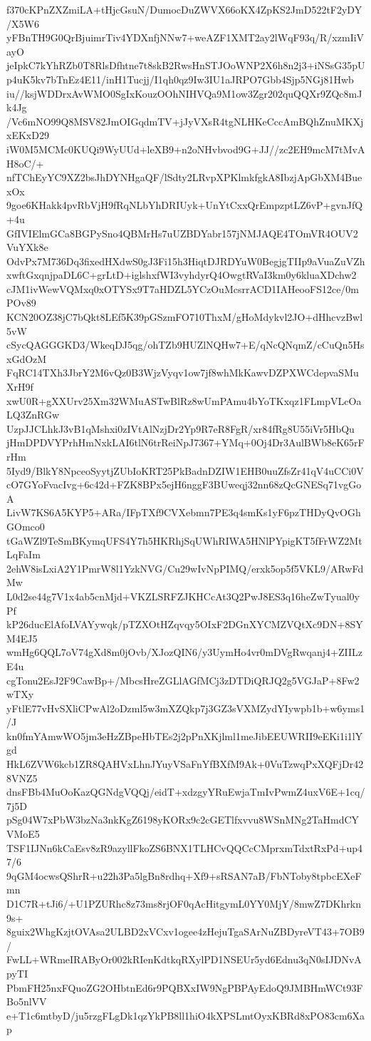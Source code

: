 f370cKPnZXZmiLA+tHjcGsuN/DumocDuZWVX66oKX4ZpKS2JmD522tF2yDY/X5W6
yFBnTH9G0QrBjuimrTiv4YDXnfjNNw7+weAZF1XMT2ay2lWqF93q/R/xzmIiVayO
jeIpkC7kYhRZb0T8RlsDfhtne7t8skB2RwsHnSTJOoWNP2X6h8n2j3+iNSsG35pU
p4uK5kv7bTnEz4E11/inH1Tucjj/I1qh0qz9Iw3IU1aJRPO7Gbb4Sjp5NGj81Hwb
iu//ksjWDDrxAvWMO0SgIxKouzOOhNIHVQa9M1ow3Zgr202quQQXr9ZQc8mJk4Jg
/Vc6mNO99Q8MSV82JmOIGqdmTV+jJyVXsR4tgNLHKeCccAmBQhZnuMKXjxEKxD29
iW0M5MCMc0KUQi9WyUUd+leXB9+n2oNHvbvod9G+JJ//zc2EH9mcM7tMvAH8oC/+
nfTChEyYC9XZ2bsJhDYNHgaQF/lSdty2LRvpXPKlmkfgkA8IbzjApGbXM4BuexOx
9goe6KHakk4pvRbVjH9fRqNLbYhDRIUyk+UnYtCxxQrEmpzptLZ6vP+gvnJfQ+4u
GfIVIElmGCa8BGPySno4QBMrHs7uUZBDYabr157jNMJAQE4TOmVR4OUV2VuYXk8e
OdvPx7M736Dq3fixedHXdwS0gJ3Fi15h3HiqtDJRDYuW0BegjgTIIp9aVuaZuVZh
xwftGxqnjpaDL6C+grLtD+iglshxfWI3vyhdyrQ4OwgtRVaI3km0y6kluaXDchw2
cJM1ivWewVQMxq0xOTYSx9T7aHDZL5YCzOuMcsrrACD1IAHeooFS12ce/0mPOv89
KCN20OZ38jC7bQkt8LEf5K39pGSzmFO710ThxM/gHoMdykvl2JO+dHhcvzBwl5vW
cSycQAGGGKD3/WkeqDJ5qg/ohTZb9HUZlNQHw7+E/qNcQNqmZ/cCuQn5HsxGdOzM
FqRC14TXh3JbrY2M6vQz0B3WjzVyqv1ow7jf8whMkKawvDZPXWCdepvaSMuXrH9f
xwU0R+gXXUrv25Xm32WMuASTwBlRz8wUmPAmu4bYoTKxqz1FLmpVLcOaLQ3ZnRGw
UzpJJCLhkJ3vB1qMshxi0zIVtAlNzjDr2Yp9R7eR8FgR/xr84fRg8U55iVr5HbQu
jHmDPDVYPrhHmNxkLAI6tlN6trReiNpJ7367+YMq+0Oj4Dr3AulBWb8eK65rFrHm
5Iyd9/BlkY8NpceoSyytjZUbIoKRT25PkBadnDZIW1EHB0uuZfsZr41qV4uCCi0V
cO7GYoFvacIvg+6c42d+FZK8BPx5ejH6nggF3BUweqj32nn68zQcGNESq71vgGoA
LivW7KS6A5KYP5+ARa/IFpTXf9CVXebmn7PE3q4smKs1yF6pzTHDyQvOGhGOmco0
tGaWZl9TeSmBKymqUFS4Y7h5HKRhjSqUWhRIWA5HNlPYpigKT5fFrWZ2MtLqFaIm
2ehW8isLxiA2Y1PmrW8l1YzkNVG/Cu29wIvNpPIMQ/erxk5op5f5VKL9/ARwFdMw
L0d2se44g7V1x4ab5cnMjd+VKZLSRFZJKHCcAt3Q2PwJ8ES3q16heZwTyual0yPf
kP26ducElAfoLVAYywqk/pTZXOtHZqvqy5OIxF2DGnXYCMZVQtXc9DN+8SYM4EJ5
wmHg6QQL7oV74gXd8m0jOvb/XJozQIN6/y3UymHo4vr0mDVgRwqanj4+ZIILzE4u
cgTonu2EsJ2F9CawBp+/MbcsHreZGLlAGfMCj3zDTDiQRJQ2g5VGJaP+8Fw2wTXy
yFtlE77vHvSXliCPwAl2oDzml5w3mXZQkp7j3GZ3sVXMZydYIywpb1b+w6yms1/J
kn0fmYAmwWO5jm3eHzZBpeHbTEs2j2pPnXKjlml1meJibEEUWRII9eEKi1i1lYgd
HkL6ZVW6kcb1ZR8QAHVxLhnJYuyVSaFnYfBXfM9Ak+0VuTzwqPxXQFjDr428VNZ5
dnsFBb4MuOoKazQGNdgVQQj/eidT+xdzgyYRuEwjaTmIvPwmZ4uxV6E+1cq/7j5D
pSg04W7xPbW3bzNa3nkKgZ6198yKORx9c2cGETlfxvvu8WSnMNg2TaHmdCYVMoE5
TSF1IJNn6kCaEsv8zR9azyllFkoZS6BNX1TLHCvQQCcCMprxmTdxtRxPd+up47/6
9qGM4ocwsQShrR+u22h3Pa5lgBn8rdhq+Xf9+sRSAN7aB/FbNToby8tpbcEXeFmn
D1C7R+tJi6/+U1PZURhc8z73ms8rjOF0qAcHitgymL0YY0MjY/8mwZ7DKhrkn9s+
8guix2WhgKzjtOVAsa2ULBD2xVCxv1ogee4zHejuTgaSArNuZBDyreVT43+7OB9/
FwLL+WRmeIRAByOr002kRIenKdtkqRXylPD1NSEUr5yd6Ednu3qN0sIJDNvApyTI
PbmFH25nxFQuoZG2OHbtnEd6r9PQBXxIW9NgPBPAyEdoQ9JMBHmWCt93FBo5nlVV
e+T1c6mtbyD/ju5rzgFLgDk1qzYkPB8ll1hiO4kXPSLmtOyxKBRd8xPO83cm6Xap
